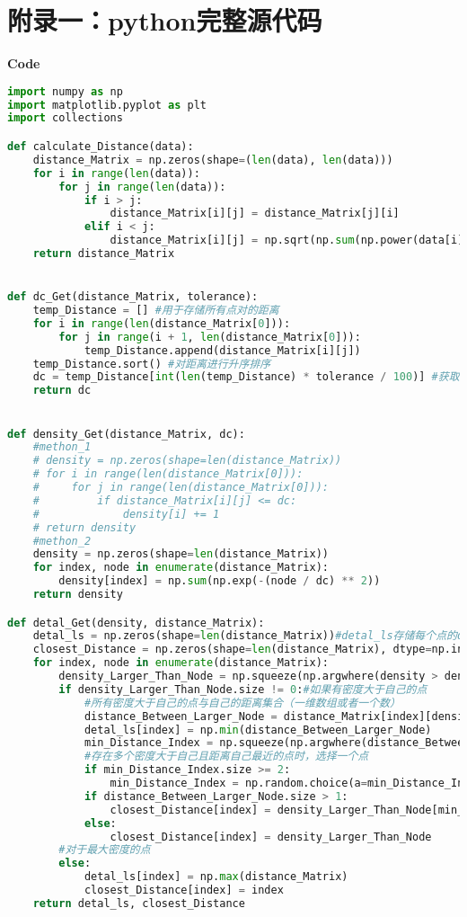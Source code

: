 \newpage
\appendix
\section{附录一：python完整源代码}
\textcolor[rgb]{0.98,0.00,0.00}{\textbf{Code}}
\begin{lstlisting}[language=python]
import numpy as np
import matplotlib.pyplot as plt
import collections

def calculate_Distance(data):
    distance_Matrix = np.zeros(shape=(len(data), len(data)))
    for i in range(len(data)):
        for j in range(len(data)):
            if i > j:
                distance_Matrix[i][j] = distance_Matrix[j][i]
            elif i < j:
                distance_Matrix[i][j] = np.sqrt(np.sum(np.power(data[i] - data[j], 2)))
    return distance_Matrix


def dc_Get(distance_Matrix, tolerance):
    temp_Distance = [] #用于存储所有点对的距离
    for i in range(len(distance_Matrix[0])):
        for j in range(i + 1, len(distance_Matrix[0])):
            temp_Distance.append(distance_Matrix[i][j])
    temp_Distance.sort() #对距离进行升序排序
    dc = temp_Distance[int(len(temp_Distance) * tolerance / 100)] #获取第tolerance%的点对距离作为截断距离
    return dc


def density_Get(distance_Matrix, dc):
    #methon_1
    # density = np.zeros(shape=len(distance_Matrix))
    # for i in range(len(distance_Matrix[0])):
    #     for j in range(len(distance_Matrix[0])):
    #         if distance_Matrix[i][j] <= dc:
    #             density[i] += 1
    # return density
    #methon_2
    density = np.zeros(shape=len(distance_Matrix))
    for index, node in enumerate(distance_Matrix):
        density[index] = np.sum(np.exp(-(node / dc) ** 2))
    return density

def detal_Get(density, distance_Matrix):
    detal_ls = np.zeros(shape=len(distance_Matrix))#detal_ls存储每个点的detal值
    closest_Distance = np.zeros(shape=len(distance_Matrix), dtype=np.int32)#closest_Distance存储比当前点密度高的点集中最近的距离点的索引
    for index, node in enumerate(distance_Matrix):
        density_Larger_Than_Node = np.squeeze(np.argwhere(density > density[index]))#存储比当前点密度大的点
        if density_Larger_Than_Node.size != 0:#如果有密度大于自己的点
            #所有密度大于自己的点与自己的距离集合（一维数组或者一个数）
            distance_Between_Larger_Node = distance_Matrix[index][density_Larger_Than_Node]
            detal_ls[index] = np.min(distance_Between_Larger_Node)
            min_Distance_Index = np.squeeze(np.argwhere(distance_Between_Larger_Node == detal_ls[index]))
            #存在多个密度大于自己且距离自己最近的点时，选择一个点
            if min_Distance_Index.size >= 2:
                min_Distance_Index = np.random.choice(a=min_Distance_Index)
            if distance_Between_Larger_Node.size > 1:
                closest_Distance[index] = density_Larger_Than_Node[min_Distance_Index]
            else:
                closest_Distance[index] = density_Larger_Than_Node
        #对于最大密度的点
        else:
            detal_ls[index] = np.max(distance_Matrix)
            closest_Distance[index] = index
    return detal_ls, closest_Distance



\end{lstlisting}
